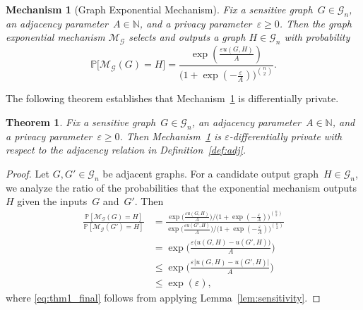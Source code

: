 \documentclass[conference]{ieeeconf}
\newtheorem{theorem}{Theorem}
\newtheorem{mechanism}{Mechanism}
\newcommand{\G}{\mathcal{G}}
\newcommand{\M}{\mathcal{M}}
\newcommand{\Prob}{\mathbb{P}}
\begin{document}
\begin{mechanism}[Graph Exponential Mechanism] \label{mech:em}
Fix a sensitive graph~$G \in \G_n$, an adjacency parameter~$A \in \mathbb{N}$, 
and a privacy parameter~$\varepsilon \geq 0$. 
 Then the \emph{graph exponential mechanism} $\M_{\G}$ selects and outputs a graph $H\in \G_n$ 
 with probability 
\begin{equation} \label{formula1}
    \mathbb{P}\big[\M_{\G}(G) = H\big]
    = \frac{\exp(\frac{\varepsilon u(G,H)}{A})}{\biggl(1+\exp(-\frac{\varepsilon}{A}) \biggr)^{\binom{n}{2}}}. 
\end{equation}
\end{mechanism}

The following theorem establishes that Mechanism~\ref{mech:em} is differentially private. 

\begin{theorem}\label{thm:mech1_dp}
    Fix a sensitive graph~$G \in \G_n$, an adjacency parameter~$A \in \mathbb{N}$, 
    and a privacy parameter~$\varepsilon \geq 0$. 
    Then Mechanism~\ref{mech:em} is $\varepsilon$-differentially private
    with respect to the adjacency relation in Definition~\ref{def:adj}.     
\end{theorem}
\begin{proof}
    Let $G, G'\in \G_n$ be adjacent graphs.
    For a candidate output graph~$H \in \G_n$, we analyze the ratio of the probabilities that the exponential mechanism outputs~$H$ given the inputs~$G$ and~$G'$. 
    Then
    \begin{align}
            \frac{\Prob[\M_\G (G)=H]}{\Prob[\M_\G(G')=H]}&=\frac{\exp \bigl( \frac{\varepsilon u(G,H)}{A}\bigr) / {\bigl(1+\exp(-\frac{\varepsilon}{A}) \bigr)^{\binom{n}{2}}}} {\exp \bigl( \frac{\varepsilon u(G',H)}{A}\bigr) / {\bigl(1+\exp(-\frac{\varepsilon}{A}) \bigr)^{\binom{n}{2}}}} \\
            &=\exp\biggl(\frac{\varepsilon \bigl(u(G,H)-u(G',H) \bigr)}{A}\biggr)\\
            &\leq \exp\biggl(\frac{\varepsilon \big|u(G,H)-u(G',H) \big|}{A}\biggr)\label{eq:thm1_almost}  \\
            &\leq \exp(\varepsilon) \label{eq:thm1_final},
    \end{align}
    where
    \eqref{eq:thm1_final} follows from applying Lemma~\ref{lem:sensitivity}.
\end{proof}
\end{document}
